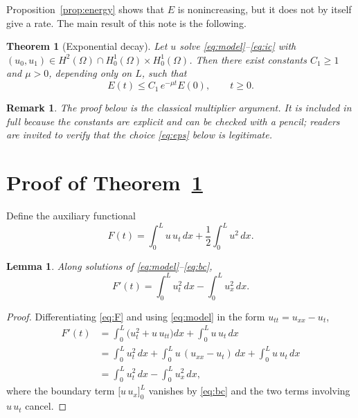 \documentclass[11pt]{article}
\newtheorem{theorem}{Theorem}
\newtheorem{lemma}{Lemma}
\newtheorem{remark}{Remark}
\theoremstyle{definition}
\begin{document}
Proposition~\ref{prop:energy} shows that $E$ is nonincreasing, but it does not by itself
give a rate. The main result of this note is the following.

\begin{theorem}[Exponential decay]
\label{thm:decay}
Let $u$ solve \eqref{eq:model}--\eqref{eq:ic} with
$(u_{0},u_{1})\in H^{2}(\Omega)\cap H^{1}_{0}(\Omega)\times H^{1}_{0}(\Omega)$.
Then there exist constants $C_{1}\ge 1$ and $\mu>0$, depending only on $L$, such that
\begin{equation}
E(t)\le C_{1}\,e^{-\mu t}E(0),\qquad t\ge 0 .
\label{eq:decay}
\end{equation}
\end{theorem}

\begin{remark}
The proof below is the classical multiplier argument. It is included in full because the
constants are explicit and can be checked with a pencil; readers are invited to verify
that the choice \eqref{eq:eps} below is legitimate.
\end{remark}

\section{Proof of Theorem~\ref{thm:decay}}

Define the auxiliary functional
\begin{equation}
F(t)=\int_{0}^{L}u\,u_{t}\,dx+\frac12\int_{0}^{L}u^{2}\,dx .
\label{eq:F}
\end{equation}

\begin{lemma}
\label{lem:F}
Along solutions of \eqref{eq:model}--\eqref{eq:bc},
\begin{equation}
F'(t)=\int_{0}^{L}u_{t}^{2}\,dx-\int_{0}^{L}u_{x}^{2}\,dx .
\label{eq:Fprime}
\end{equation}
\end{lemma}

\begin{proof}
Differentiating \eqref{eq:F} and using \eqref{eq:model} in the form
$u_{tt}=u_{xx}-u_{t}$,
\begin{align*}
F'(t)&=\int_{0}^{L}\bigl(u_{t}^{2}+u\,u_{tt}\bigr)dx+\int_{0}^{L}u\,u_{t}\,dx\\
&=\int_{0}^{L}u_{t}^{2}\,dx+\int_{0}^{L}u\,(u_{xx}-u_{t})\,dx+\int_{0}^{L}u\,u_{t}\,dx\\
&=\int_{0}^{L}u_{t}^{2}\,dx-\int_{0}^{L}u_{x}^{2}\,dx ,
\end{align*}
where the boundary term $\bigl[u\,u_{x}\bigr]_{0}^{L}$ vanishes by \eqref{eq:bc}
and the two terms involving $u\,u_{t}$ cancel.
\end{proof}
\end{document}
